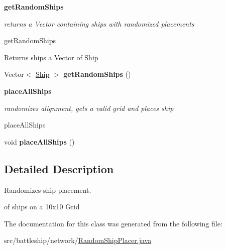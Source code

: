 \begin{Indent}{\bf get\+Random\+Ships}\par
{\em returns a Vector containing ships with randomized placements

get\+Random\+Ships

\begin{DoxyReturn}{Returns}
ships a Vector of Ship 
\end{DoxyReturn}
}\begin{DoxyCompactItemize}
\item 
\hypertarget{classbattleship_1_1network_1_1RandomShipPlacer_ae420c06a79e2570a8944996652f38fc2}{}Vector$<$ \hyperlink{classbattleship_1_1ships_1_1Ship}{Ship} $>$ {\bfseries get\+Random\+Ships} ()\label{classbattleship_1_1network_1_1RandomShipPlacer_ae420c06a79e2570a8944996652f38fc2}

\end{DoxyCompactItemize}
\end{Indent}
\begin{Indent}{\bf place\+All\+Ships}\par
{\em randomizes alignment, gets a valid grid and places ship

place\+All\+Ships }\begin{DoxyCompactItemize}
\item 
\hypertarget{classbattleship_1_1network_1_1RandomShipPlacer_aa84aaf67147ab4e83c0ccbeeba586bcc}{}void {\bfseries place\+All\+Ships} ()\label{classbattleship_1_1network_1_1RandomShipPlacer_aa84aaf67147ab4e83c0ccbeeba586bcc}

\end{DoxyCompactItemize}
\end{Indent}


\subsection{Detailed Description}
Randomizes ship placement. 

of ships on a 10x10 Grid 

The documentation for this class was generated from the following file\+:\begin{DoxyCompactItemize}
\item 
src/battleship/network/\hyperlink{RandomShipPlacer_8java}{Random\+Ship\+Placer.\+java}\end{DoxyCompactItemize}
